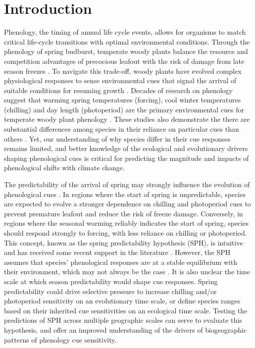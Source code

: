 \documentclass[12pt]{article}
\begin{document}
\section*{Introduction}

Phenology, the timing of annual life cycle events, allows for organisms to match critical life-cycle transitions with optimal environmental conditions. Through the phenology of spring budburst, temperate woody plants balance the resource and competition advantages of precocious leafout with the risk of damage from late season freezes \citep{Savage:2013aa}. To navigate this trade-off, woody plants have evolved complex physiological responses to sense environmental cues that signal the arrival of suitable conditions for resuming growth \citep{Polgar2011}. Decades of research on phenology suggest that warming spring temperatures (forcing), cool winter temperatures (chilling) and day length (photoperiod) are the primary environmental cues for temperate woody plant phenology \citep{Ettinger:2020aa,Forrest2010}. These studies also demonstrate the there are substantial differences among species in their reliance on particular cues than others \citep{Laube:2014aa,Pau2011}. Yet, our understanding of why species differ in their cue responses remains limited, and better knowledge of the ecological and evolutionary drivers shaping phenological cues is critical for predicting the magnitude and impacts of phenological shifts with climate change.


The predictability of the arrival of spring may strongly influence the evolution of phenological cues \citep{Zohner:2017aa,Zohner:2017ua,Dawson2025}. In regions where the start of spring is unpredictable, species are expected to evolve a stronger dependence on chilling and photoperiod cues to prevent premature leafout and reduce the risk of freeze damage. Conversely, in regions where the seasonal warming reliably indicates the start of spring, species should respond strongly to forcing, with less reliance on chilling or photoperiod. This concept, known as the spring predictability hypothesis (SPH), is intuitive and has received some recent support in the literature \citep{Zohner:2017aa}. However, the SPH assumes that species' phenological responses are at a stable equilibrium with their environment, which may not always be the case \citep{Normand2011,Lechowicz1984}. It is also unclear the time scale at which season predictability would shape cue responses. Spring predictability could drive selective pressure to increase chilling and/or photoperiod sensitivity on an evolutionary time scale, or define species ranges based on their inherited cue sensitivities on an ecological time scale. Testing the predictions of SPH across multiple geographic scales can serve to evaluate this hypothesis, and offer an improved understanding of the drivers of biogeographic patterns of phenology cue sensitivity.
\end{document}
